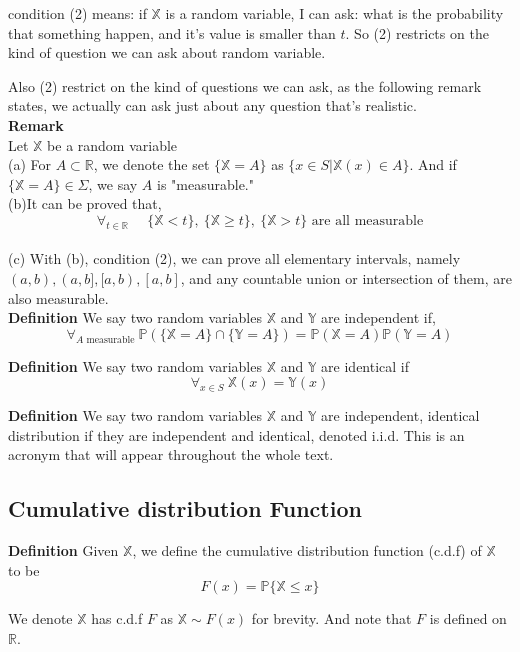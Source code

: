 \documentclass[a4paper,12pt]{article}
\begin{document}
condition (2) means: if $\mathbb{X}$ is a random variable, I can ask: what is the probability that something happen, and it's value is smaller than $t$. So (2) restricts on the kind of question we can ask about random variable.

Also (2) restrict on the kind of questions we can ask, as the following remark states, we actually can ask just about any question that's realistic.\\

\textbf{Remark}\\
Let $\mathbb{X}$ be a random variable\\
(a) For $A \subset \mathbb{R}$, we denote the set $\{ \mathbb{X} = A \}$ as $\{ x \in S | \mathbb{X}(x) \in A \}$. And if $\{ \mathbb{X} = A \}\in\Sigma$, we say $A$ is "measurable."\\
(b)It can be proved that, 
$$\forall_{t\in \mathbb{R}} \ \ \ \ \ \ \{\mathbb{X} < t \},\ \{\mathbb{X} \geq t \},\ \{\mathbb{X} > t \} \text{ are all measurable}$$\\
(c) With (b), condition (2), we can prove all elementary intervals, namely $(a, b), (a, b], [a, b), [a, b]$, and any countable union or intersection of them, are also measurable.\\

\textbf{Definition} We say two random variables $\mathbb{X}$ and $\mathbb{Y}$ are independent if, $$\forall_{A\text{ measurable } }\mathbb{P}( \{\mathbb{X} = A\} \cap \{\mathbb{Y} = A\} ) = \mathbb{P}(\mathbb{X} = A)\mathbb{P}(\mathbb{Y} = A)$$

\textbf{Definition} We say two random variables $\mathbb{X}$ and $\mathbb{Y}$ are identical if $$\forall_{x\in S}\ \mathbb{X}(x) = \mathbb{Y}(x)$$

\textbf{Definition} We say two random variables $\mathbb{X}$ and $\mathbb{Y}$ are independent, identical distribution if they are independent and identical, denoted i.i.d. This is an acronym that will appear throughout the whole text.

\subsection{Cumulative distribution Function}

\textbf{Definition} Given $\mathbb{X}$, we define the cumulative distribution function (c.d.f) of $\mathbb{X}$ to be $$F(x) = \mathbb{P}\{\mathbb{X} \leq x\}$$

We denote $\mathbb{X}$ has c.d.f $F$ as $\mathbb{X} \sim F(x)$ for brevity. And note that $F$ is defined on $\mathbb{R}$.
\end{document}
